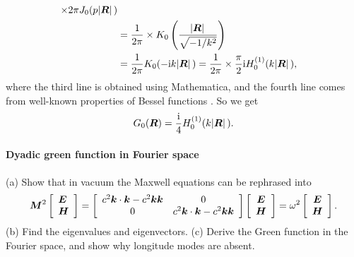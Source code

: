 \documentclass[hyperref, a4paper]{article}
\newcommand*{\ii}{\mathrm{i}}
\begin{document}
\begin{itemize}
\[\begin{aligned}
        \times 2\pi J_0(p \abs*{\vb*{R}}) \\
        &= \frac{1}{2\pi} \times K_0\left(\frac{\abs*{\vb*{R}}}{\sqrt{- 1 / k^2}}\right) \\
        &= \frac{1}{2\pi} K_0(- \ii k \abs*{\vb*{R}}) 
        = \frac{1}{2\pi} \times \frac{\pi}{2} \ii H_0^{(1)}(k \abs*{\vb*{R}}) ,
    \end{aligned}
\]
where the third line is obtained using Mathematica, and the fourth line comes from well-known properties 
of Bessel functions \cite{besselwiki}. So we get 
\begin{equation}
    G_0(\vb*{R}) = \frac{\ii}{4} H_0^{(1)}(k \abs*{\vb*{R}}). 
\end{equation}

\end{itemize}

\paragraph{}

\paragraph{Dyadic green function in Fourier space} (a) Show that in vacuum the Maxwell equations can be rephrased 
into 
\begin{equation}
    \vb*{M}^{2}\left[\begin{array}{l}
        \vb*{E} \\
        \vb*{H}
        \end{array}\right]=\left[\begin{array}{cc}
        c^{2} \vb*{k} \cdot \vb*{k}-c^{2} \vb*{k} \vb*{k} & 0 \\
        0 & c^{2} \vb*{k} \cdot \vb*{k}-c^{2} \vb*{k} \vb*{k}
        \end{array}\right]\left[\begin{array}{c}
        \vb*{E} \\
        \vb*{H}
        \end{array}\right]=\omega^{2}\left[\begin{array}{c}
        \vb*{E} \\
        \vb*{H}
        \end{array}\right].
        \label{eq:maxwell-eigen}
\end{equation}
(b) Find the eigenvalues and eigenvectors. (c) Derive the Green function in the Fourier space, 
and show why longitude modes are absent.
\end{document}
